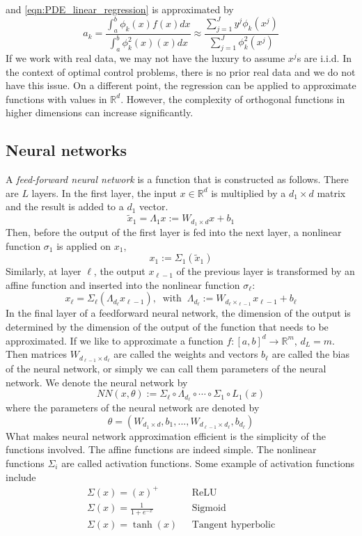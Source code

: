 \documentclass[11pt]{book}
\begin{document}
and \eqref{eqn:PDE_linear_regression} is approximated by
\[
a_k = \frac{\int_a^b \phi_k(x)f(x)dx}{\int_a^b \phi^2_k(x)(x)dx} \approx \frac{\sum_{j=1}^{J}y^j\phi_{k}(x^{j})}{\sum_{j=1}^{J}\phi^2_{k}(x^{j})}
\]
If we work with real data, we may not have the luxury to assume $x^j$s are i.i.d. In the context of optimal control problems, there is no prior real data and we do not have this issue. On a different point, the regression can be applied to approximate functions with values in $\mathbb{R}^d$. However, the complexity of orthogonal functions in higher dimensions can increase significantly. 

\subsection{Neural networks}
A \emph{feed-forward neural network} is a function that is constructed as follows. There are $L$ layers.
In the first layer, the input $x\in\mathbb{R}^d$ is multiplied by  a $d_1\times d$ matrix and the result is added to a $d_1$ vector. 
\[
\tilde{x}_1=\Lambda_1x:=W_{d_1\times d}x+b_1
\]
Then, before the output of the first layer is fed into the next layer, a nonlinear function $\sigma_1$ is applied on $x_1$,
\[
x_1:=\Sigma_1(\tilde{x}_1)
\]
Similarly, at layer $\ell$, the output $x_{\ell-1}$ of the previous layer is transformed by an affine function and inserted into the nonlinear function $\sigma_\ell$:
\[
x_\ell=\Sigma_{\ell}(\Lambda_{d_\ell}x_{\ell-1}), ~\text{ with }~\Lambda_{d_\ell}:=W_{d_{\ell}\times_{\ell-1}}x_{\ell-1}+b_\ell
\]
In the final layer of a feedforward neural network, the dimension of the output is determined by the dimension of the output of the function that needs to be approximated.
If we like to approximate a function $f:[a,b]^d\to\mathbb{R}^m$, $d_L=m$. Then matrices $W_{d_{\ell-1}\times{d_{\ell}}}$  are called the weights and vectors $b_\ell$ are called the bias of the neural network, or simply we can call them parameters of the neural network. We denote the neural network by
\[
NN(x,\theta):=\Sigma_{\ell}\circ\Lambda_{d_\ell}\circ\cdots\circ\Sigma_1\circ L_{1}(x)
\]
where the parameters of the neural network are denoted by
\[
\theta=(W_{d_1\times d},b_1,...,W_{d_{\ell-1}\times d_\ell},b_{d_{\ell}})
\]
What makes neural network approximation efficient is the simplicity of the functions involved. The affine functions are indeed simple. The nonlinear functions $\Sigma_i$ are called activation functions. Some example of activation functions include
\begin{align}
    \Sigma(x)=(x)^+&~~~\text{ReLU}\\
    \Sigma(x)=\frac{1}{1+e^{-x}}&~~~\text{Sigmoid}\\
    \Sigma(x)=\tanh(x)&~~~\text{Tangent hyperbolic}
\end{align}
\end{document}
